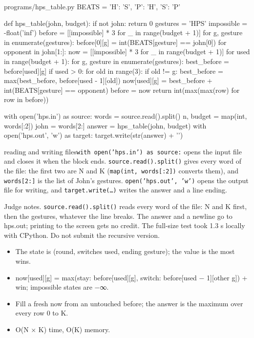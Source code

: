 \documentclass[11pt,a4paper,oneside]{report}
\newcommand{\nextpointer}[1]{\par\smallskip{\color{quiet}\textbf{Next.} #1}\par}
\begin{document}
\begin{bookcode}{programs/hps\_table.py}
BEATS = {'H': 'S', 'P': 'H', 'S': 'P'}

def hps_table(john, budget):
    if not john:
        return 0
    gestures = 'HPS'
    impossible = -float('inf')
    before = [[impossible] * 3 for _ in range(budget + 1)]
    for g, gesture in enumerate(gestures):
        before[0][g] = int(BEATS[gesture] == john[0])
    for opponent in john[1:]:
        now = [[impossible] * 3 for _ in range(budget + 1)]
        for used in range(budget + 1):
            for g, gesture in enumerate(gestures):
                best_before = before[used][g]
                if used > 0:
                    for old in range(3):
                        if old != g:
                            best_before = max(best_before, before[used - 1][old])
                now[used][g] = best_before + int(BEATS[gesture] == opponent)
        before = now
    return int(max(max(row) for row in before))

with open('hps.in') as source:
    words = source.read().split()
n, budget = map(int, words[:2])
john = words[2:]
answer = hps_table(john, budget)
with open('hps.out', 'w') as target:
    target.write(str(answer) + '\n')
\end{bookcode}
\begin{pythonnote}{reading and writing files}\texttt{with open('hps.in') as source:} opens the input file and closes it when the block ends. \texttt{source.read().split()} gives every word of the file: the first two are N and K (\texttt{map(int, words[:2])} converts them), and \texttt{words[2:]} is the list of John's gestures. \texttt{open('hps.out', 'w')} opens the output file for writing, and \texttt{target.write(…)} writes the answer and a line ending.\end{pythonnote}
Judge notes. \texttt{source.read().split()} reads every word of the file: N and K first, then the gestures, whatever the line breaks. The answer and a newline go to hps.out; printing to the screen gets no credit. The full-size test took 1.3 s locally with CPython. Do not submit the recursive version.

\par{}\par\begin{itemize}\item The state is (round, switches used, ending gesture); the value is the most wins.\item now[used][g] = max(stay: before[used][g], switch: before[used − 1][other g]) + win; impossible states are −∞.\item Fill a fresh now from an untouched before; the answer is the maximum over every row 0 to K.\item O(N × K) time, O(K) memory.\end{itemize}
\nextpointer{Bring the five lessons together.}
\end{document}
